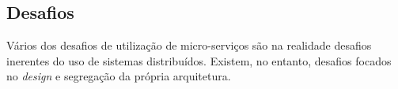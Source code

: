        
    
    
\subsection{Desafios}   

    Vários dos desafios de utilização de micro-serviços são na realidade desafios inerentes do uso de sistemas distribuídos. Existem, no entanto, desafios focados no \textit{design} e segregação da própria arquitetura.
    
    
    
    
    
    
    
    
    
    
    

    
    
    
    
    
    
    
